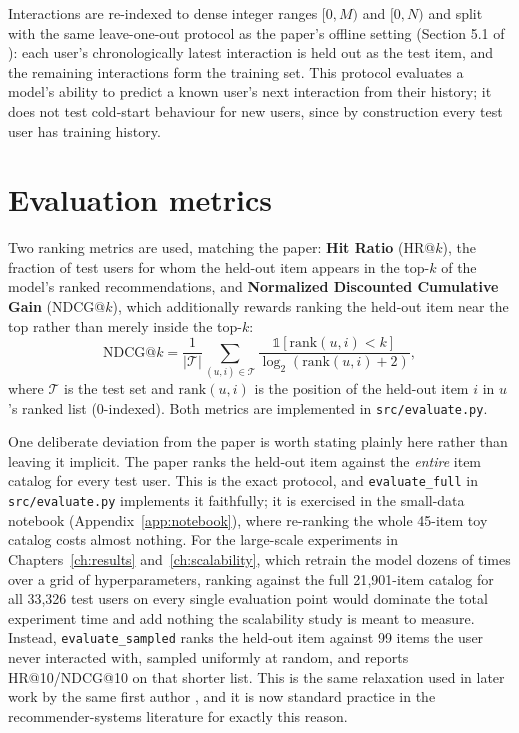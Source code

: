 Interactions are re-indexed to dense integer ranges $[0,M)$ and $[0,N)$ and
split with the same leave-one-out protocol as the paper's offline setting
(Section 5.1 of \citealp{he2016eals}): each user's chronologically latest
interaction is held out as the test item, and the remaining interactions
form the training set. This protocol evaluates a model's ability to
predict a known user's next interaction from their history; it does not
test cold-start behaviour for new users, since by construction every test
user has training history.

\section{Evaluation metrics}

Two ranking metrics are used, matching the paper: \textbf{Hit Ratio}
(HR@$k$), the fraction of test users for whom the held-out item appears in
the top-$k$ of the model's ranked recommendations, and \textbf{Normalized
Discounted Cumulative Gain} (NDCG@$k$), which additionally rewards ranking
the held-out item near the top rather than merely inside the top-$k$:
\[
  \mathrm{NDCG@}k = \frac{1}{|\mathcal{T}|}\sum_{(u,i)\in\mathcal{T}}
  \frac{\mathbb{1}[\mathrm{rank}(u,i) < k]}{\log_2(\mathrm{rank}(u,i)+2)},
\]
where $\mathcal{T}$ is the test set and $\mathrm{rank}(u,i)$ is the
position of the held-out item $i$ in $u$'s ranked list (0-indexed). Both
metrics are implemented in \texttt{src/evaluate.py}.

\medskip
One deliberate deviation from the paper is worth stating plainly here
rather than leaving it implicit. The paper ranks the held-out item against
the \emph{entire} item catalog for every test user. This is the exact
protocol, and \texttt{evaluate\_full} in \texttt{src/evaluate.py}
implements it faithfully; it is exercised in the small-data notebook
(Appendix~\ref{app:notebook}), where re-ranking the whole 45-item toy
catalog costs almost nothing. For the large-scale experiments in
Chapters~\ref{ch:results} and~\ref{ch:scalability}, which retrain the model
dozens of times over a grid of hyperparameters, ranking against the full
21{,}901-item catalog for all 33{,}326 test users on every single
evaluation point would dominate the total experiment time and add nothing
the scalability study is meant to measure. Instead,
\texttt{evaluate\_sampled} ranks the held-out item against 99 items the
user never interacted with, sampled uniformly at random, and reports
HR@10/NDCG@10 on that shorter list. This is the same relaxation used in
later work by the same first author \citep{he2017ncf}, and it is now
standard practice in the recommender-systems literature for exactly this
reason.

